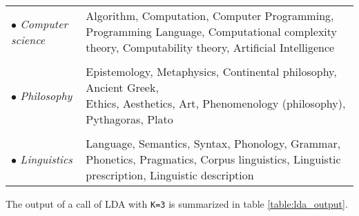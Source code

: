 \documentclass[a4paper,ngerman, english]{atseminar}
\begin{document}
\begin{tabular}{l l}
$\bullet$ \textit{Computer science} & \parbox[t]{10cm}{Algorithm, Computation, Computer Programming,  Programming Language, Computational complexity theory, Computability theory, Artificial Intelligence}\\  
\\
$\bullet$ \textit{Philosophy} & \parbox[t]{10cm}{Epistemology, Metaphysics, Continental philosophy, Ancient Greek,\\ Ethics, Aesthetics, Art, Phenomenology (philosophy), Pythagoras, Plato} \\
\\
$\bullet$ \textit{Linguistics} &  \parbox[t]{10cm}{Language, Semantics, Syntax, Phonology, Grammar,
               Phonetics, Pragmatics,  Corpus linguistics, Linguistic prescription, Linguistic description}
\end{tabular}

\vspace{1.3cm}

                               
The output of a call of LDA with \texttt{K=3} is summarized in table \ref{table:lda_output}.
\end{document}
